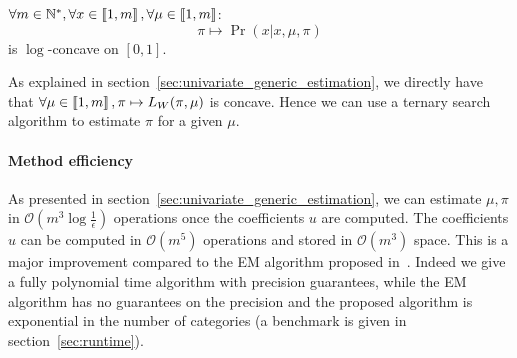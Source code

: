 \begin{conjecture}
    $\forall m \in \mathbb{N}^*, \forall x \in \left\llbracket1, m\right\rrbracket, \forall \mu \in \left\llbracket1, m\right\rrbracket$:
    \[\pi \mapsto \Pr(x | x, \mu, \pi) \] 
    is $\log$-concave on $[0, 1]$.
\end{conjecture}

As explained in section~\ref{sec:univariate_generic_estimation}, we directly have that $\forall \mu \in \left\llbracket1, m\right\rrbracket, \pi \mapsto L_W(\pi, \mu)$ is concave. Hence we can use a ternary search algorithm to estimate $\pi$ for a given $\mu$.

\paragraph{Method efficiency}

As presented in section~\ref{sec:univariate_generic_estimation}, we can estimate $\mu, \pi$ in $\mathcal O(m^3 \log \frac{1}{\epsilon})$ operations once the coefficients $u$ are computed. The coefficients $u$ can be computed in $\mathcal O(m^5)$ operations and stored in $\mathcal O(m^3)$ space. This is a major improvement compared to the EM algorithm proposed in~\cite{biernacki2016model}. Indeed we give a fully polynomial time algorithm with precision guarantees, while the EM algorithm has no guarantees on the precision and the proposed algorithm is exponential in the number of categories (a benchmark is given in section~\ref{sec:runtime}).




